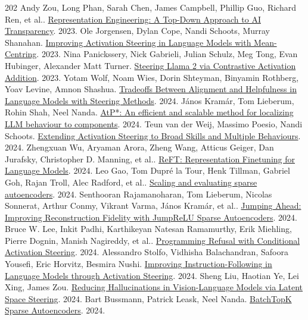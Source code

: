 \begin{thebibliography}{202}
 Andy Zou, Long Phan, Sarah Chen, James Campbell, Phillip Guo, Richard Ren, et al.. \href{https://arxiv.org/abs/2310.01405}{Representation Engineering: A Top-Down Approach to AI Transparency}. 2023.
 Ole Jorgensen, Dylan Cope, Nandi Schoots, Murray Shanahan. \href{https://arxiv.org/abs/2312.03813v1}{Improving Activation Steering in Language Models with Mean-Centring}. 2023.
 Nina Panickssery, Nick Gabrieli, Julian Schulz, Meg Tong, Evan Hubinger, Alexander Matt Turner. \href{https://arxiv.org/abs/2312.06681}{Steering Llama 2 via Contrastive Activation Addition}. 2023.
 Yotam Wolf, Noam Wies, Dorin Shteyman, Binyamin Rothberg, Yoav Levine, Amnon Shashua. \href{https://arxiv.org/abs/2401.16332v5}{Tradeoffs Between Alignment and Helpfulness in Language Models with Steering Methods}. 2024.
 János Kramár, Tom Lieberum, Rohin Shah, Neel Nanda. \href{https://arxiv.org/abs/2403.00745v1}{AtP*: An efficient and scalable method for localizing LLM behaviour to components}. 2024.
 Teun van der Weij, Massimo Poesio, Nandi Schoots. \href{https://arxiv.org/abs/2403.05767v1}{Extending Activation Steering to Broad Skills and Multiple Behaviours}. 2024.
 Zhengxuan Wu, Aryaman Arora, Zheng Wang, Atticus Geiger, Dan Jurafsky, Christopher D. Manning, et al.. \href{https://arxiv.org/abs/2404.03592}{ReFT: Representation Finetuning for Language Models}. 2024.
 Leo Gao, Tom Dupré la Tour, Henk Tillman, Gabriel Goh, Rajan Troll, Alec Radford, et al.. \href{https://arxiv.org/abs/2406.04093}{Scaling and evaluating sparse autoencoders}. 2024.
 Senthooran Rajamanoharan, Tom Lieberum, Nicolas Sonnerat, Arthur Conmy, Vikrant Varma, János Kramár, et al.. \href{https://arxiv.org/abs/2407.14435v3}{Jumping Ahead: Improving Reconstruction Fidelity with JumpReLU Sparse Autoencoders}. 2024.
 Bruce W. Lee, Inkit Padhi, Karthikeyan Natesan Ramamurthy, Erik Miehling, Pierre Dognin, Manish Nagireddy, et al.. \href{https://arxiv.org/abs/2409.05907v3}{Programming Refusal with Conditional Activation Steering}. 2024.
 Alessandro Stolfo, Vidhisha Balachandran, Safoora Yousefi, Eric Horvitz, Besmira Nushi. \href{https://arxiv.org/abs/2410.12877v2}{Improving Instruction-Following in Language Models through Activation Steering}. 2024.
 Sheng Liu, Haotian Ye, Lei Xing, James Zou. \href{https://arxiv.org/abs/2410.15778v2}{Reducing Hallucinations in Vision-Language Models via Latent Space Steering}. 2024.
 Bart Bussmann, Patrick Leask, Neel Nanda. \href{https://arxiv.org/abs/2412.06410v1}{BatchTopK Sparse Autoencoders}. 2024.

\end{thebibliography}
